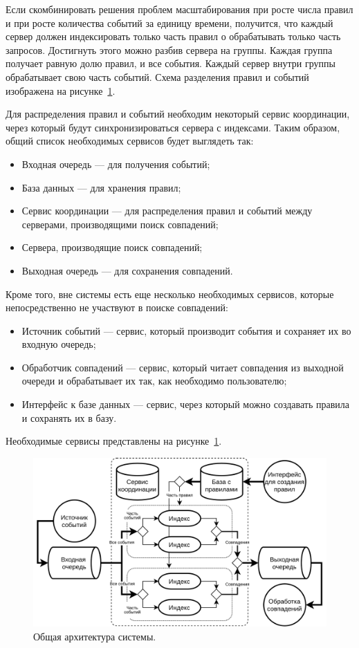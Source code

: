 \documentclass[14pt]{article}
\begin{document}
Если скомбинировать решения проблем масштабирования при росте числа правил и при росте количества событий за единицу времени, получится, что каждый сервер должен индексировать только часть правил о обрабатывать только часть запросов. Достигнуть этого можно разбив сервера на группы. Каждая группа получает равную долю правил, и все события. Каждый сервер внутри группы обрабатывает свою часть событий. Схема разделения правил и событий изображена на рисунке~\ref{fig:commonArch}.

Для распределения правил и событий необходим некоторый сервис координации, через который будут синхронизироваться сервера с индексами. Таким образом, общий список необходимых сервисов будет выглядеть так:
\begin{itemize}
    \item Входная очередь --- для получения событий;
    \item База данных --- для хранения правил;
    \item Сервис координации --- для распределения правил и событий между серверами, производящими поиск совпадений;
    \item Сервера, производящие поиск совпадений;
    \item Выходная очередь --- для сохранения совпадений.
\end{itemize}
Кроме того, вне системы есть еще несколько необходимых сервисов, которые непосредственно не участвуют в поиске совпадений:
\begin{itemize}
    \item Источник событий --- сервис, который производит события и сохраняет их во входную очередь;
    \item Обработчик совпадений --- сервис, который читает совпадения из выходной очереди и обрабатывает их так, как необходимо пользователю;
    \item Интерфейс к базе данных --- сервис, через который можно создавать правила и сохранять их в базу.
\end{itemize}
Необходимые сервисы представлены на рисунке~\ref{fig:commonArch}.

\begin{figure}[h]
  \centering
    \includegraphics[width=1\textwidth]{images/arch/commonArch.png}
    \caption{Общая архитектура системы.}
    \label{fig:commonArch}
\end{figure}
\end{document}
